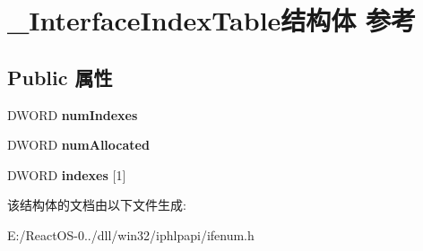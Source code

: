 \hypertarget{struct___interface_index_table}{}\section{\+\_\+\+Interface\+Index\+Table结构体 参考}
\label{struct___interface_index_table}
\subsection*{Public 属性}
\begin{DoxyCompactItemize}
\item 
\mbox{\label{struct___interface_index_table_a121c072a1d4fd88f42388ef4bcc06651}} 
D\+W\+O\+RD {\bfseries num\+Indexes}
\item 
\mbox{\label{struct___interface_index_table_a0f02f360a243c2aa66c26f23e7341141}} 
D\+W\+O\+RD {\bfseries num\+Allocated}
\item 
\mbox{\label{struct___interface_index_table_abce38191cc860dc20dc36737fc11fe3d}} 
D\+W\+O\+RD {\bfseries indexes} \mbox{[}1\mbox{]}
\end{DoxyCompactItemize}


该结构体的文档由以下文件生成\+:\begin{DoxyCompactItemize}
\item 
E\+:/\+React\+O\+S-\/0../dll/win32/iphlpapi/ifenum.\+h\end{DoxyCompactItemize}
